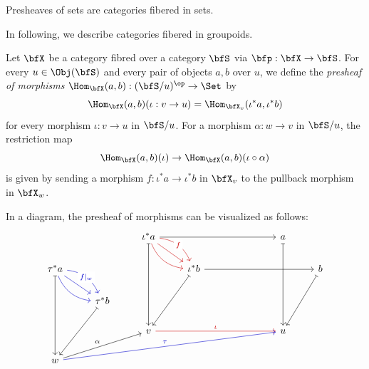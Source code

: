     \begin{example}\label{eg:toy_example_of_fibered_categories}
    \end{example}

    \begin{slogan}\label{slogan:presheaf_is_set-fibered_category}
        Presheaves of sets are categories fibered in sets.
    \end{slogan}

    In following, we describe categories fibered in groupoids.

    \begin{definition}\label{def:presheaves_of_morphisms_associated_to_fibred_categories}
        Let \(\bfX\) be a category fibred over a category \(\bfS\) via \(\bfp: \bfX \to \bfS\).
        For every \(u \in \Obj(\bfS)\) and every pair of objects \(a,b\) over \(u\), we define the \emph{presheaf of morphisms} \(\Hom_{\bfX}(a,b): (\bfS/u)^{\op} \to \Set\) by
        \[ \Hom_{\bfX}(a,b)(\iota: v \to u) = \Hom_{\bfX_v}(\iota^*a, \iota^*b) \]
        for every morphism \(\iota: v \to u\) in \(\bfS/u\).
        For a morphism \(\alpha: w \to v\) in \(\bfS/u\), the restriction map
        \[ \Hom_{\bfX}(a,b)(\iota) \to \Hom_{\bfX}(a,b)(\iota \circ \alpha) \]
        is given by sending a morphism \(f: \iota^*a \to \iota^*b\) in \(\bfX_v\) to the pullback morphism 
        in \(\bfX_w\).
    \end{definition}

    In a diagram, the presheaf of morphisms can be visualized as follows:
    \[\begin{tikzcd}
        && {\iota^*a} &&&& a \\
        {\tau^*a} &&& {\iota^*b} &&&& b \\
        & {\tau^*b} \\
        && v &&&& u \\
        w
        \arrow[from=1-3, to=1-7]
        \arrow[bend right,red!80!black, from=1-3, to=2-4]
        \arrow["f"{description}, bend left,red!80!black, from=1-3, to=2-4]
        \arrow[from=1-3,red!80!black, to=2-4]
        \arrow[maps to, from=1-3, to=4-3]
        \arrow[maps to, from=1-7, to=4-7]
        \arrow["{f|_w}"{description},blue!80!black, bend left, from=2-1, to=3-2]
        \arrow[bend right,blue!80!black, from=2-1, to=3-2]
        \arrow[from=2-1,blue!80!black, to=3-2]
        \arrow[maps to, from=2-1, to=5-1]
        \arrow[from=2-4, to=2-8]
        \arrow[maps to, from=2-4, to=4-3]
        \arrow[maps to, from=2-8, to=4-7]
        \arrow[maps to, from=3-2, to=5-1]
        \arrow["\iota",red!80!black,  from=4-3, to=4-7]
        \arrow["\alpha",from=5-1, to=4-3]
        \arrow["\tau", from=5-1, blue!80!black, to=4-7]
    \end{tikzcd}\]

